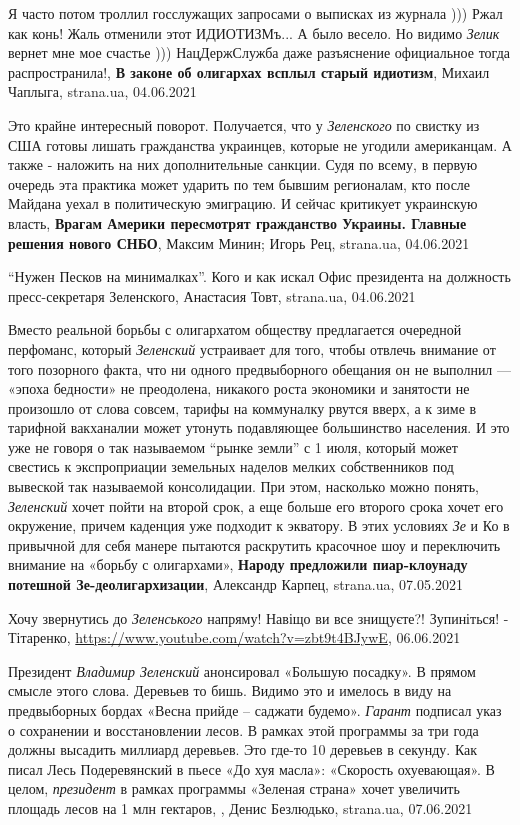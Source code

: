 Я часто потом троллил госслужащих запросами о выписках из журнала ))) Ржал как
конь! Жаль отменили этот ИДИОТИЗМъ... А было весело. Но видимо \emph{Зелик}
вернет мне мое счастье ))) НацДержСлужба даже разъяснение официальное тогда
распространила!,
\textbf{В законе об олигархах всплыл старый идиотизм},
Михаил Чаплыга, strana.ua, 04.06.2021

Это крайне интересный поворот. Получается, что у \emph{Зеленского} по свистку
из США готовы лишать гражданства украинцев, которые не угодили американцам. А
также - наложить на них дополнительные санкции.  Судя по всему, в первую
очередь эта практика может ударить по тем бывшим регионалам, кто после Майдана
уехал в политическую эмиграцию. И сейчас критикует украинскую власть, 
\textbf{Врагам Америки пересмотрят гражданство Украины. Главные решения нового СНБО}, 
Максим Минин; Игорь Рец, strana.ua, 04.06.2021

\enquote{Нужен Песков на минималках}. Кого и как искал Офис президента на должность пресс-секретаря Зеленского,
Анастасия Товт, strana.ua, 04.06.2021

Вместо реальной борьбы с олигархатом обществу предлагается очередной перфоманс,
который \emph{Зеленский} устраивает для того, чтобы отвлечь внимание от того
позорного факта, что ни одного предвыборного обещания он не выполнил — «эпоха
бедности» не преодолена, никакого роста экономики и занятости не произошло от
слова совсем, тарифы на коммуналку рвутся вверх, а к зиме в тарифной вакханалии
может утонуть подавляющее большинство населения. И это уже не говоря о так
называемом \enquote{рынке земли} с 1 июля, который может свестись к
экспроприации земельных наделов мелких собственников под вывеской так
называемой консолидации. При этом, насколько можно понять, \emph{Зеленский}
хочет пойти на второй срок, а еще больше его второго срока хочет его окружение,
причем каденция уже подходит к экватору. В этих условиях \emph{Зе} и Ко в
привычной для себя манере пытаются раскрутить красочное шоу и переключить
внимание на «борьбу с олигархами», 
\textbf{Народу предложили пиар-клоунаду потешной Зе-деолигархизации},
Александр Карпец, strana.ua, 07.05.2021

Хочу звернутись до \emph{Зеленського} напряму! Навіщо ви все знищуєте?! Зупиніться! - Тітаренко,
\url{https://www.youtube.com/watch?v=zbt9t4BJywE}, 06.06.2021

Президент \emph{Владимир Зеленский} анонсировал «Большую посадку». В прямом смысле
этого слова. Деревьев то бишь. Видимо это и имелось в виду на предвыборных
бордах «Весна прийде – саджати будемо». \emph{Гарант} подписал указ о сохранении и
восстановлении лесов. В рамках этой программы за три года должны высадить
миллиард деревьев. Это где-то 10 деревьев в секунду. Как писал Лесь
Подеревянский в пьесе «До хуя масла»: «Скорость охуевающая». В целом, \emph{президент}
в рамках программы «Зеленая страна» хочет увеличить площадь лесов на 1 млн
гектаров,
, Денис Безлюдько, strana.ua, 07.06.2021

